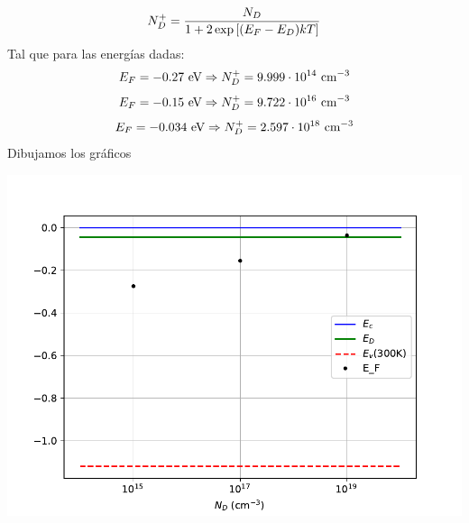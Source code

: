 \begin{texercise}
	\begin{equation}
		N_D^+ = \frac{N_D}{1+2\exp\left[ (E_F-E_D)kT \right]}
	\end{equation}
	Tal que para las energías dadas:
	\begin{equation}
		E_F= -0.27  \ \text{eV} \Rightarrow N_D^+ =  9.999\cdot 10^{14}  \ \text{cm}^{-3}
	\end{equation}
	\begin{equation}
		E_F = -0.15 \ \text{eV}\Rightarrow N_D^+ =  9.722\cdot 10^{16} \ \text{cm}^{-3}
	\end{equation}
	\begin{equation}
		E_F =-0.034 \ \eV \Rightarrow N_D^+ = 2.597 \cdot 10^{18}  \ \cm^{-3}
	\end{equation}
	Dibujamos los gráficos
	\begin{center}
		\includegraphics[width=0.9\linewidth]{Cuerpo/Ch_01/Ejercicio_01_8.pdf}
	\end{center}
\end{texercise}



